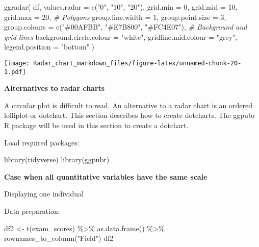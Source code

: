 \documentclass[
]{article}
\newenvironment{Shaded}{\begin{snugshade}}{\end{snugshade}}
\newcommand{\AttributeTok}[1]{\textcolor[rgb]{0.77,0.63,0.00}{#1}}
\newcommand{\CommentTok}[1]{\textcolor[rgb]{0.56,0.35,0.01}{\textit{#1}}}
\newcommand{\DecValTok}[1]{\textcolor[rgb]{0.00,0.00,0.81}{#1}}
\newcommand{\FunctionTok}[1]{\textcolor[rgb]{0.00,0.00,0.00}{#1}}
\newcommand{\NormalTok}[1]{#1}
\newcommand{\OtherTok}[1]{\textcolor[rgb]{0.56,0.35,0.01}{#1}}
\newcommand{\SpecialCharTok}[1]{\textcolor[rgb]{0.00,0.00,0.00}{#1}}
\newcommand{\StringTok}[1]{\textcolor[rgb]{0.31,0.60,0.02}{#1}}
\begin{document}
\begin{Shaded}
\begin{Highlighting}[]
\FunctionTok{ggradar}\NormalTok{(}
\NormalTok{  df, }
  \AttributeTok{values.radar =} \FunctionTok{c}\NormalTok{(}\StringTok{"0"}\NormalTok{, }\StringTok{"10"}\NormalTok{, }\StringTok{"20"}\NormalTok{),}
  \AttributeTok{grid.min =} \DecValTok{0}\NormalTok{, }\AttributeTok{grid.mid =} \DecValTok{10}\NormalTok{, }\AttributeTok{grid.max =} \DecValTok{20}\NormalTok{,}
  \CommentTok{\# Polygons}
  \AttributeTok{group.line.width =} \DecValTok{1}\NormalTok{, }
  \AttributeTok{group.point.size =} \DecValTok{3}\NormalTok{,}
  \AttributeTok{group.colours =} \FunctionTok{c}\NormalTok{(}\StringTok{"\#00AFBB"}\NormalTok{, }\StringTok{"\#E7B800"}\NormalTok{, }\StringTok{"\#FC4E07"}\NormalTok{),}
  \CommentTok{\# Background and grid lines}
  \AttributeTok{background.circle.colour =} \StringTok{"white"}\NormalTok{,}
  \AttributeTok{gridline.mid.colour =} \StringTok{"grey"}\NormalTok{,}
  \AttributeTok{legend.position =} \StringTok{"bottom"}
\NormalTok{  )}
\end{Highlighting}
\end{Shaded}

\texttt{[image: Radar\_chart\_markdown\_files/figure-latex/unnamed-chunk-20-1.pdf]}

\textbf{Alternatives to radar charts}

A circular plot is difficult to read. An alternative to a radar chart is
an ordered lolliplot or dotchart. This section describes how to create
dotcharts. The ggpubr R package will be used in this section to create a
dotchart.

Load required packages:

\begin{Shaded}
\begin{Highlighting}[]
\FunctionTok{library}\NormalTok{(tidyverse)}
\FunctionTok{library}\NormalTok{(ggpubr)}
\end{Highlighting}
\end{Shaded}

\textbf{Case when all quantitative variables have the same scale}

Displaying one individual

Data preparation:

\begin{Shaded}
\begin{Highlighting}[]
\NormalTok{df2 }\OtherTok{\textless{}{-}} \FunctionTok{t}\NormalTok{(exam\_scores) }\SpecialCharTok{\%\textgreater{}\%}
  \FunctionTok{as.data.frame}\NormalTok{() }\SpecialCharTok{\%\textgreater{}\%}
  \FunctionTok{rownames\_to\_column}\NormalTok{(}\StringTok{"Field"}\NormalTok{)}
\NormalTok{df2}
\end{Highlighting}
\end{Shaded}
\end{document}
